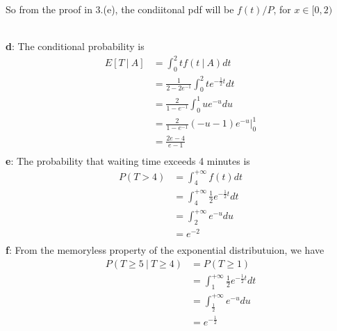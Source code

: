 \documentclass[12pt,letterpaper]{article}
\begin{document}
    So from the proof in 3.(e), the condiitonal pdf will be $f(t) / P$, for $x \in [0, 2)$ \\
         \\
    \textbf{d}: The conditional probability is
        \begin{equation*}
            \begin{aligned}
                E[T\ |\ A] &= \int_{0}^{2} tf(t\ |\ A)dt \\
                &= \frac{1}{2 - 2e^{-1}}\int_{0}^{2} t e^{-\frac{1}{2}t}dt \\
                &= \frac{2}{1 - e^{-1}} \int_{0}^{1} ue^{-u}du \\
                &= \frac{2}{1 - e^{-1}} (-u - 1)e^{-u}|_{0}^{1} \\
                &= \frac{2e - 4}{e - 1} \\
            \end{aligned}
        \end{equation*}
    \textbf{e}: The probability that waiting time exceeds 4 minutes is
        \begin{equation*}
            \begin{aligned}
                P(T > 4) &= \int_{4}^{+\infty} f(t)dt \\
                &= \int_{4}^{+\infty} \frac{1}{2} e^{-\frac{1}{2}t} dt \\
                &= \int_{2}^{+\infty} e^{-u} du \\
                &= e^{-2} \\
            \end{aligned}
        \end{equation*}
    \textbf{f}: From the memoryless property of the exponential distributuion, we have
        \begin{equation*}
            \begin{aligned}
                P(T \geq 5\ |\ T \geq 4) &= P(T \geq 1) \\
                &= \int_{1}^{+\infty} \frac{1}{2} e^{-\frac{1}{2}t} dt \\
                &= \int_{\frac{1}{2}}^{+\infty} e^{-u} du \\
                &= e^{-\frac{1}{2}} \\
            \end{aligned}
        \end{equation*}
\end{document}
